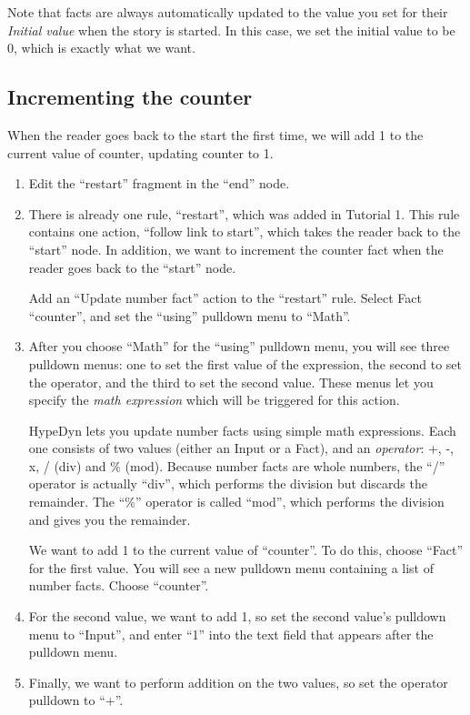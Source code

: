 \documentclass{article}
\begin{document}
\noindent Note that facts are always automatically updated to the value you set for their \textit{Initial value} when the story is started. In this case, we set the initial value to be 0, which is exactly what we want. 

\subsection{Incrementing the counter}

When the reader goes back to the start the first time, we will add 1 to the current value of counter, updating counter to 1.

\begin{enumerate}
    \item Edit the ``restart'' fragment in the ``end'' node. 
    \item There is already one rule, ``restart'', which was added in 
    Tutorial 1. This rule contains one action, ``follow link to 
    start'', which takes the reader back to the ``start'' node. In 
    addition, we want to increment the counter fact when the reader 
    goes back to the ``start'' node.
    
    Add an ``Update number fact'' action to the ``restart'' rule. Select Fact ``counter'', and set the ``using'' pulldown menu to ``Math''.
    \item After you choose ``Math'' for the ``using'' pulldown menu, you will see three pulldown menus: one to set the first value of the expression, the second to set the operator, and the third to set the second value. These menus let you specify the \textit{math expression} which will be triggered for this action. 
    
HypeDyn lets you update number facts using simple math expressions. Each one consists of two values (either an Input or a Fact), and an \textit{operator}: +, -, x, / (div) and \% (mod). Because number facts are whole numbers, the ``/'' operator is actually ``div'', which performs the division but discards the remainder. The ``\%'' operator is called ``mod'', which performs the division and gives you the remainder.
    
We want to add 1 to the current value of ``counter''. To do this, choose ``Fact'' for the first value. You will see a new pulldown menu containing a list of number facts. Choose ``counter''.
    \item For the second value, we want to add 1, so set the second value's pulldown menu to ``Input'', and enter ``1'' into the text field that appears after the pulldown menu. 
    \item Finally, we want to perform addition on the two values, so set the operator pulldown to ``+''.
\end{enumerate}
\end{document}
